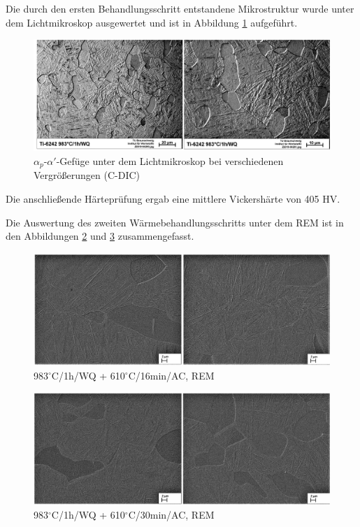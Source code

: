 Die durch den ersten Behandlungsschritt entstandene Mikrostruktur wurde unter dem Lichtmikroskop ausgewertet und ist in Abbildung \ref{fig:abbildung-19} aufgeführt.

\begin{figure}[h]
	\centering
	\includegraphics[width=0.9\linewidth]{./Bilder/Abbildung 19.png}
	\caption[Abbildung 19]{$\alpha_p$-$\alpha'$-Gefüge unter dem Lichtmikroskop bei verschiedenen Vergrößerungen (C-DIC)}
	\label{fig:abbildung-19}
\end{figure}

Die anschließende Härteprüfung ergab eine mittlere Vickershärte von 405 HV.

Die Auswertung des zweiten Wärmebehandlungsschritts unter dem REM ist in den Abbildungen \ref{fig:abbildung-26} und \ref{fig:abbildung-27} zusammengefasst.

\begin{figure}[h]
	\centering
	\includegraphics[width=0.9\linewidth]{./Bilder/Abbildung 26.png}
	\caption[Abbildung 26]{983$^\circ$C/1h/WQ + 610$^\circ$C/16min/AC, REM}
	\label{fig:abbildung-26}
\end{figure}

\begin{figure}[h]
	\centering
	\includegraphics[width=0.9\linewidth]{./Bilder/Abbildung 27.png}
	\caption[Abbildung 27]{983$^\circ$C/1h/WQ + 610$^\circ$C/30min/AC, REM}
	\label{fig:abbildung-27}
\end{figure}

